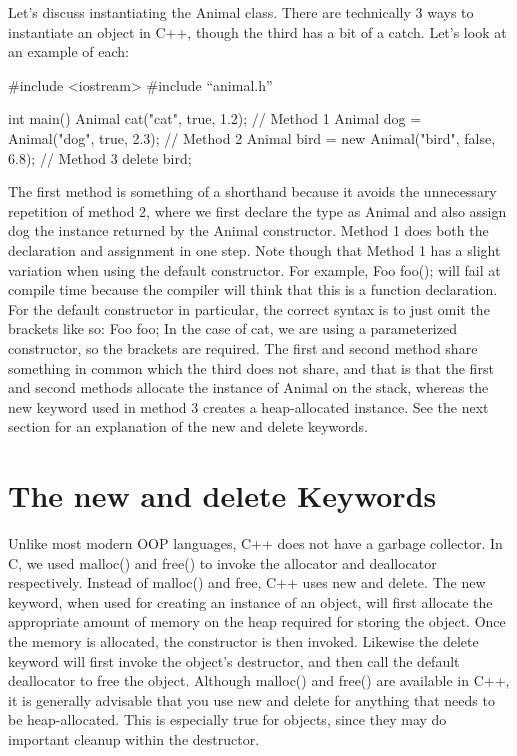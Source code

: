 \documentclass{article}
\begin{document}
Let's discuss instantiating the Animal class. There are technically 3 ways to instantiate an object in C++,
though the third has a bit of a catch. Let's look at an example of each:

\begin{cpplst}
#include <iostream>
#include “animal.h”

int main()
{
    Animal cat("cat", true, 1.2); // Method 1
    Animal dog = Animal("dog", true, 2.3); // Method 2
    Animal bird = new Animal("bird", false, 6.8); // Method 3
    delete bird;
}
\end{cpplst}

The first method is something of a shorthand because it avoids the unnecessary repetition of method 2, where
we first declare the type as Animal and also assign dog the instance returned by the Animal constructor. Method
1 does both the declaration and assignment in one step. Note though that Method 1 has a slight variation when
using the default constructor. For example, Foo foo(); will fail at compile time because the compiler will
think that this is a function declaration. For the default constructor in particular, the correct syntax is to
just omit the brackets like so: Foo foo; In the case of cat, we are using a parameterized constructor, so the
brackets are required. The first and second method share something in common which the third does not share,
and that is that the first and second methods allocate the instance of Animal on the stack, whereas the new
keyword used in method 3 creates a heap-allocated instance. See the next section for an explanation of the new
and delete keywords.

\section{The new and delete Keywords}

Unlike most modern OOP languages, C++ does not have a garbage collector. In C, we used malloc() and free() to
invoke the allocator and deallocator respectively. Instead of malloc() and free, C++ uses new and delete. The
new keyword, when used for creating an instance of an object, will first allocate the appropriate amount of
memory on the heap required for storing the object. Once the memory is allocated, the constructor is then
invoked. Likewise the delete keyword will first invoke the object's destructor, and then call the default
deallocator to free the object. Although malloc() and free() are available in C++, it is generally advisable
that you use new and delete for anything that needs to be heap-allocated. This is especially true for objects,
since they may do important cleanup within the destructor.
\end{document}
